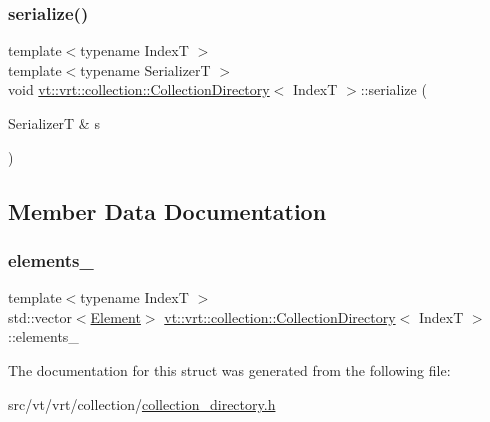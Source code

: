 \subsubsection{\texorpdfstring{serialize()}{serialize()}}
{\footnotesize\ttfamily template$<$typename IndexT $>$ \\
template$<$typename SerializerT $>$ \\
void \hyperlink{structvt_1_1vrt_1_1collection_1_1_collection_directory}{vt\+::vrt\+::collection\+::\+Collection\+Directory}$<$ IndexT $>$\+::serialize (\begin{DoxyParamCaption}\item[{SerializerT \&}]{s }\end{DoxyParamCaption})\hspace{0.3cm}{\ttfamily [inline]}}



\subsection{Member Data Documentation}
\mbox{\label{structvt_1_1vrt_1_1collection_1_1_collection_directory_abd9de4d084eb8cf4206c4729af70f734}} 
\subsubsection{\texorpdfstring{elements\+\_\+}{elements\_}}
{\footnotesize\ttfamily template$<$typename IndexT $>$ \\
std\+::vector$<$\hyperlink{structvt_1_1vrt_1_1collection_1_1_collection_directory_1_1_element}{Element}$>$ \hyperlink{structvt_1_1vrt_1_1collection_1_1_collection_directory}{vt\+::vrt\+::collection\+::\+Collection\+Directory}$<$ IndexT $>$\+::elements\+\_\+}



The documentation for this struct was generated from the following file\+:\begin{DoxyCompactItemize}
\item 
src/vt/vrt/collection/\hyperlink{collection__directory_8h}{collection\+\_\+directory.\+h}\end{DoxyCompactItemize}
